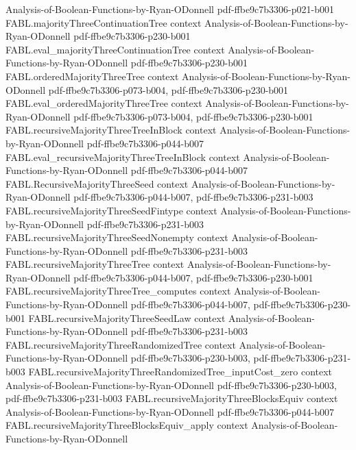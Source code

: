 \begin{theorem}
  {Analysis-of-Boolean-Functions-by-Ryan-ODonnell}
  {pdf-ffbe9c7b3306-p021-b001}
\proofstep
  {FABL.majorityThreeContinuationTree}
  {context}
  {Analysis-of-Boolean-Functions-by-Ryan-ODonnell}
  {pdf-ffbe9c7b3306-p230-b001}
\proofstep
  {FABL.eval_majorityThreeContinuationTree}
  {context}
  {Analysis-of-Boolean-Functions-by-Ryan-ODonnell}
  {pdf-ffbe9c7b3306-p230-b001}
\proofstep
  {FABL.orderedMajorityThreeTree}
  {context}
  {Analysis-of-Boolean-Functions-by-Ryan-ODonnell}
  {pdf-ffbe9c7b3306-p073-b004,
    pdf-ffbe9c7b3306-p230-b001}
\proofstep
  {FABL.eval_orderedMajorityThreeTree}
  {context}
  {Analysis-of-Boolean-Functions-by-Ryan-ODonnell}
  {pdf-ffbe9c7b3306-p073-b004,
    pdf-ffbe9c7b3306-p230-b001}
\proofstep
  {FABL.recursiveMajorityThreeTreeInBlock}
  {context}
  {Analysis-of-Boolean-Functions-by-Ryan-ODonnell}
  {pdf-ffbe9c7b3306-p044-b007}
\proofstep
  {FABL.eval_recursiveMajorityThreeTreeInBlock}
  {context}
  {Analysis-of-Boolean-Functions-by-Ryan-ODonnell}
  {pdf-ffbe9c7b3306-p044-b007}
\proofstep
  {FABL.RecursiveMajorityThreeSeed}
  {context}
  {Analysis-of-Boolean-Functions-by-Ryan-ODonnell}
  {pdf-ffbe9c7b3306-p044-b007,
    pdf-ffbe9c7b3306-p231-b003}
\proofstep
  {FABL.recursiveMajorityThreeSeedFintype}
  {context}
  {Analysis-of-Boolean-Functions-by-Ryan-ODonnell}
  {pdf-ffbe9c7b3306-p231-b003}
\proofstep
  {FABL.recursiveMajorityThreeSeedNonempty}
  {context}
  {Analysis-of-Boolean-Functions-by-Ryan-ODonnell}
  {pdf-ffbe9c7b3306-p231-b003}
\proofstep
  {FABL.recursiveMajorityThreeTree}
  {context}
  {Analysis-of-Boolean-Functions-by-Ryan-ODonnell}
  {pdf-ffbe9c7b3306-p044-b007,
    pdf-ffbe9c7b3306-p230-b001}
\proofstep
  {FABL.recursiveMajorityThreeTree_computes}
  {context}
  {Analysis-of-Boolean-Functions-by-Ryan-ODonnell}
  {pdf-ffbe9c7b3306-p044-b007,
    pdf-ffbe9c7b3306-p230-b001}
\proofstep
  {FABL.recursiveMajorityThreeSeedLaw}
  {context}
  {Analysis-of-Boolean-Functions-by-Ryan-ODonnell}
  {pdf-ffbe9c7b3306-p231-b003}
\proofstep
  {FABL.recursiveMajorityThreeRandomizedTree}
  {context}
  {Analysis-of-Boolean-Functions-by-Ryan-ODonnell}
  {pdf-ffbe9c7b3306-p230-b003,
    pdf-ffbe9c7b3306-p231-b003}
\proofstep
  {FABL.recursiveMajorityThreeRandomizedTree_inputCost_zero}
  {context}
  {Analysis-of-Boolean-Functions-by-Ryan-ODonnell}
  {pdf-ffbe9c7b3306-p230-b003,
    pdf-ffbe9c7b3306-p231-b003}
\proofstep
  {FABL.recursiveMajorityThreeBlocksEquiv}
  {context}
  {Analysis-of-Boolean-Functions-by-Ryan-ODonnell}
  {pdf-ffbe9c7b3306-p044-b007}
\proofstep
  {FABL.recursiveMajorityThreeBlocksEquiv_apply}
  {context}
  {Analysis-of-Boolean-Functions-by-Ryan-ODonnell}

\end{theorem}
